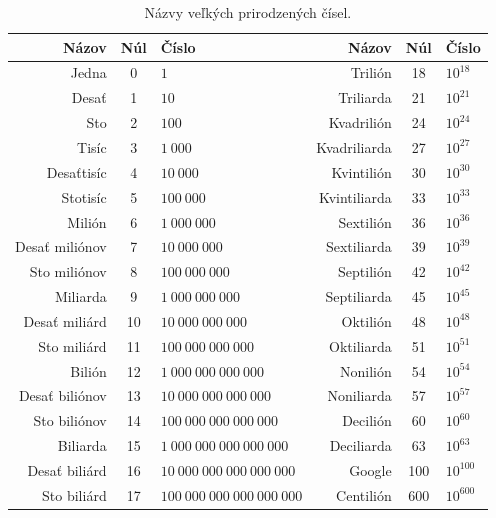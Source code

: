 \documentclass{report}
\begin{document}
\begin{table}[H]
  \centering
  \renewcommand{\arraystretch}{1.2}
  \begin{tabular}{|r|c|l|r|c|l|}
    \hline
    \textbf{Názov} & \textbf{Núl} & \textbf{Číslo} &
    \textbf{Názov} & \textbf{Núl} & \textbf{Číslo} \\
    \hline
    Jedna & 0 & \(1\) &
    Trilión & 18 & \(10^{18}\) \\
    \hline
    Desať & 1 & \(10\) &
    Triliarda & 21 & \(10^{21}\) \\
    \hline
    Sto & 2 & \(100\) &
    Kvadrilión & 24 & \(10^{24}\) \\
    \hline
    Tisíc & 3 & \(1\ 000\) &
    Kvadriliarda & 27 & \(10^{27}\) \\
    \hline
    Desaťtisíc & 4 & \(10\ 000\) &
    Kvintilión & 30 & \(10^{30}\) \\
    \hline
    Stotisíc & 5 & \(100\ 000\) &
    Kvintiliarda & 33 & \(10^{33}\) \\
    \hline
    Milión & 6 & \(1\ 000\ 000\) &
    Sextilión & 36 & \(10^{36}\) \\
    \hline
    Desať miliónov & 7 & \(10\ 000\ 000\) &
    Sextiliarda & 39 & \(10^{39}\) \\
    \hline
    Sto miliónov & 8 & \(100\ 000\ 000\) &
    Septilión & 42 & \(10^{42}\) \\
    \hline
    Miliarda & 9 & \(1\ 000\ 000\ 000\) &
    Septiliarda & 45 & \(10^{45}\) \\
    \hline
    Desať miliárd & 10 & \(10\ 000\ 000\ 000\) &
    Oktilión & 48 & \(10^{48}\) \\
    \hline
    Sto miliárd & 11 & \(100\ 000\ 000\ 000\) &
    Oktiliarda & 51 & \(10^{51}\) \\
    \hline
    Bilión & 12 & \(1\ 000\ 000\ 000\ 000\) &
    Nonilión & 54 & \(10^{54}\) \\
    \hline
    Desať biliónov & 13 & \(10\ 000\ 000\ 000\ 000\) &
    Noniliarda & 57 & \(10^{57}\) \\
    \hline
    Sto biliónov & 14 & \(100\ 000\ 000\ 000\ 000\) &
    Decilión & 60 & \(10^{60}\) \\
    \hline
    Biliarda & 15 & \(1\ 000\ 000\ 000\ 000\ 000\) &
    Deciliarda & 63 & \(10^{63}\) \\
    \hline
    Desať biliárd & 16 & \(10\ 000\ 000\ 000\ 000\ 000\) &
    Google & 100 & \(10^{100}\) \\
    \hline
    Sto biliárd & 17 & \(100\ 000\ 000\ 000\ 000\ 000\) &
    Centilión & 600 & \(10^{600}\) \\
    \hline
  \end{tabular}
  \caption{Názvy veľkých prirodzených čísel.}
\end{table}
\end{document}

